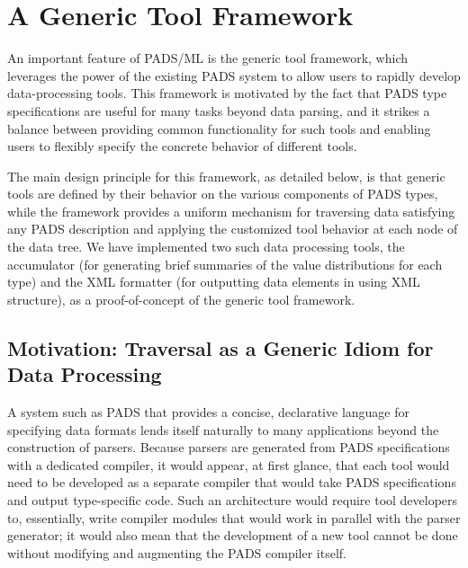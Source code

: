 \section{A Generic Tool Framework}
\label{sec:gen-tool}

An important feature of PADS/ML is the generic tool framework, which leverages the power of the existing PADS system to allow users to rapidly develop data-processing tools. This framework is motivated by the fact that PADS type specifications are useful for many tasks beyond data parsing, and it strikes a balance between providing common functionality for such tools and enabling users to flexibly specify the concrete behavior of different tools.

The main design principle for this framework, as detailed below, is that generic tools are defined by their behavior on the various components of PADS types, while the framework provides a uniform mechanism for traversing data satisfying any PADS description and applying the customized tool behavior at each node of the data tree. We have implemented two such data processing tools, the accumulator (for generating brief summaries of the value distributions for each type) and the XML formatter (for outputting data elements in using XML structure), as a proof-of-concept of the generic tool framework.

\subsection{Motivation: Traversal as a Generic Idiom for Data Processing}
\label{sec:gen-tool-motivation}
A system such as PADS that provides a concise, declarative language for specifying data formats lends itself naturally to many applications beyond the construction of parsers. Because parsers are generated from PADS specifications with a dedicated compiler, it would appear, at first glance, that each tool would need to be developed as a separate compiler that would take PADS specifications and output type-specific code. Such an architecture would require tool developers to, essentially, write compiler modules that would work in parallel with the parser generator; it would also mean that the development of a new tool cannot be done without modifying and augmenting the PADS compiler itself.


